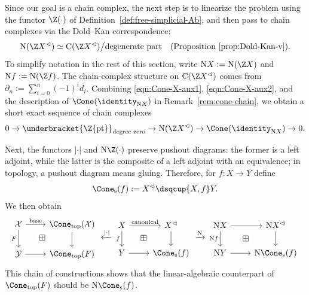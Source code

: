Since our goal is a chain complex, the next step is to linearize the problem
using the functor $\Z(\mathord\cdot)$ of
Definition~\ref{def:free-simplicial-Ab}, and then pass to chain complexes via
the Dold--Kan correspondence:
\begin{equation*}
	\mathrm{N}(\Z X^{\lhd}) \simeq \mathrm{C}(\Z X^{\lhd}) \big/ \text{degenerate part} \quad \text{(Proposition \ref{prop:Dold-Kan-v})}.
\end{equation*}
To simplify notation in the rest of this section, write
$\mathrm{N}X:=\mathrm{N}(\Z X)$ and
$\mathrm{N}f:=\mathrm{N}(\Z f)$. The chain-complex structure on
$\mathrm{C}(\Z X^{\lhd})$ comes from
$\partial_n:=\sum_{i=0}^n(-1)^id_i$. Combining
\eqref{eqn:Cone-X-aux1}, \eqref{eqn:Cone-X-aux2}, and the description of
$\Cone(\identity_{\mathrm{N}X})$ in Remark~\ref{rem:cone-chain}, we obtain a
short exact sequence of chain complexes
\[ 0 \to \underbracket{\Z\{\mathrm{pt}\}}_{\text{degree zero}} \to \mathrm{N}(\Z X^{\lhd}) \to \Cone(\identity_{\mathrm{N}X}) \to 0. \]

Next, the functors $|\mathord\cdot|$ and
$\mathrm{N}\Z(\mathord\cdot)$ preserve pushout diagrams: the former is a
left adjoint, while the latter is the composite of a left adjoint with an
equivalence; in topology, a pushout diagram means gluing. Therefore, for
$f:X\to Y$ define
\begin{equation*}
	\Cone_{\mathrm{s}}(f) := X^{\lhd} \dsqcup{X, f} Y.
\end{equation*}
We then obtain
\[\begin{tikzcd}
	\mathcal{X} \arrow[d, "F"'] \arrow[r, "{\text{base}}"] & \Cone_{\mathrm{top}}(\mathcal{X}) \arrow[d] \\
	\mathcal{Y} \arrow[r] & \Cone_{\mathrm{top}}(F) \arrow[phantom, lu, "\boxplus" description]
\end{tikzcd} \xleftarrow{|\cdot|} \begin{tikzcd}
	X \arrow[d, "f"'] \arrow[r, "\text{canonical}"] & X^{\lhd} \arrow[d] \\
	Y \arrow[r] & \Cone_{\mathrm{s}}(f) \arrow[phantom, lu, "\boxplus" description]
\end{tikzcd} \xrightarrow{\mathrm{N}} \begin{tikzcd}
	\mathrm{N}X \arrow[d, "{\mathrm{N}f}"'] \arrow[r] & \mathrm{N}X^{\lhd} \arrow[d] \\
	\mathrm{N}Y \arrow[r] & \mathrm{N}\Cone_{\mathrm{s}}(f) \arrow[phantom, lu, "\boxplus" description]
\end{tikzcd}\]
This chain of constructions shows that the linear-algebraic counterpart of
$\Cone_{\mathrm{top}}(F)$ should be $\mathrm{N}\Cone_{\mathrm{s}}(f)$.

